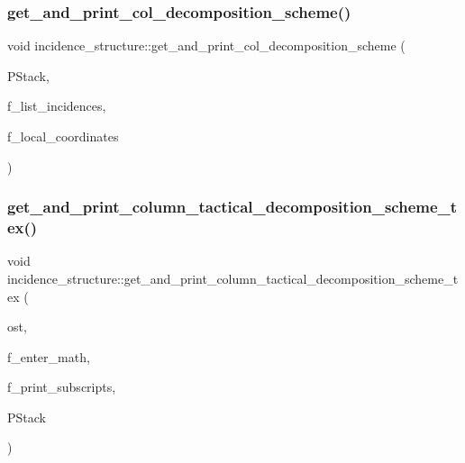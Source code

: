 \subsubsection{\texorpdfstring{get\+\_\+and\+\_\+print\+\_\+col\+\_\+decomposition\+\_\+scheme()}{get\_and\_print\_col\_decomposition\_scheme()}}
{\footnotesize\ttfamily void incidence\+\_\+structure\+::get\+\_\+and\+\_\+print\+\_\+col\+\_\+decomposition\+\_\+scheme (\begin{DoxyParamCaption}\item[{\mbox{\hyperlink{classpartitionstack}{partitionstack}} \&}]{P\+Stack,  }\item[{\mbox{\hyperlink{galois_8h_a09fddde158a3a20bd2dcadb609de11dc}{I\+NT}}}]{f\+\_\+list\+\_\+incidences,  }\item[{\mbox{\hyperlink{galois_8h_a09fddde158a3a20bd2dcadb609de11dc}{I\+NT}}}]{f\+\_\+local\+\_\+coordinates }\end{DoxyParamCaption})}

\mbox{\label{classincidence__structure_a579c0686f4e480a4239e7a00c80f665f}} 
\subsubsection{\texorpdfstring{get\+\_\+and\+\_\+print\+\_\+column\+\_\+tactical\+\_\+decomposition\+\_\+scheme\+\_\+tex()}{get\_and\_print\_column\_tactical\_decomposition\_scheme\_tex()}}
{\footnotesize\ttfamily void incidence\+\_\+structure\+::get\+\_\+and\+\_\+print\+\_\+column\+\_\+tactical\+\_\+decomposition\+\_\+scheme\+\_\+tex (\begin{DoxyParamCaption}\item[{ostream \&}]{ost,  }\item[{\mbox{\hyperlink{galois_8h_a09fddde158a3a20bd2dcadb609de11dc}{I\+NT}}}]{f\+\_\+enter\+\_\+math,  }\item[{\mbox{\hyperlink{galois_8h_a09fddde158a3a20bd2dcadb609de11dc}{I\+NT}}}]{f\+\_\+print\+\_\+subscripts,  }\item[{\mbox{\hyperlink{classpartitionstack}{partitionstack}} \&}]{P\+Stack }\end{DoxyParamCaption})}

